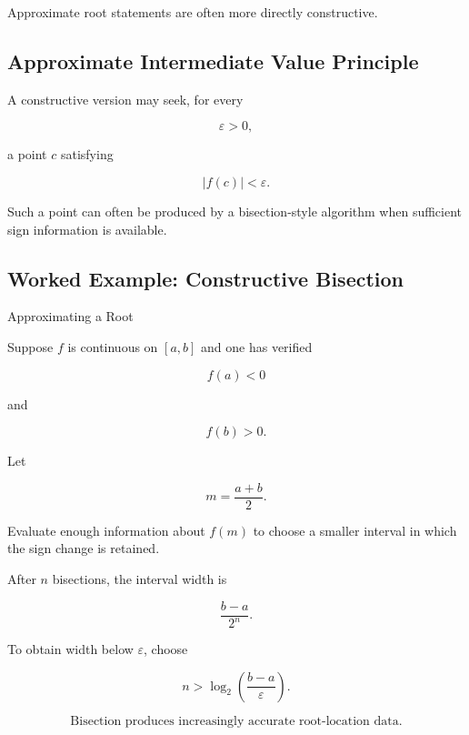 Approximate root statements are often more directly constructive.

\subsection{Approximate Intermediate Value Principle}
\label{subsec:approximate-intermediate-value}

A constructive version may seek, for every

\[
\varepsilon>0,
\]

a point \(c\) satisfying

\[
\boxed{
|f(c)|<\varepsilon.
}
\]

Such a point can often be produced by a bisection-style algorithm when
sufficient sign information is available.

\subsection{Worked Example: Constructive Bisection}
\label{subsec:worked-constructive-bisection}

\begin{workedexamplebox}{Approximating a Root}

Suppose \(f\) is continuous on \([a,b]\) and one has verified

\[
f(a)<0
\]

and

\[
f(b)>0.
\]

Let

\[
m=\frac{a+b}{2}.
\]

Evaluate enough information about \(f(m)\) to choose a smaller interval in
which the sign change is retained.

After \(n\) bisections, the interval width is

\[
\frac{b-a}{2^n}.
\]

To obtain width below \(\varepsilon\), choose

\[
n
>
\log_2
\left(
\frac{b-a}{\varepsilon}
\right).
\]

\begin{answerbox}
\[
\boxed{
\text{Bisection produces increasingly accurate root-location data.}
}
\]
\end{answerbox}

\end{workedexamplebox}

